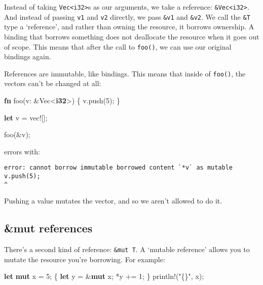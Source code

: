 \documentclass[a4paper,]{book}
\newenvironment{Shaded}{\begin{snugshade}}{\end{snugshade}}
\newcommand{\KeywordTok}[1]{\textcolor[rgb]{0.13,0.29,0.53}{\textbf{{#1}}}}
\newcommand{\DecValTok}[1]{\textcolor[rgb]{0.00,0.00,0.81}{{#1}}}
\newcommand{\StringTok}[1]{\textcolor[rgb]{0.31,0.60,0.02}{{#1}}}
\newcommand{\OtherTok}[1]{\textcolor[rgb]{0.56,0.35,0.01}{{#1}}}
\newcommand{\NormalTok}[1]{{#1}}
\begin{document}
Instead of taking \texttt{Vec\textless{}i32\textgreater{}}s as our
arguments, we take a reference:
\texttt{\&Vec\textless{}i32\textgreater{}}. And instead of passing
\texttt{v1} and \texttt{v2} directly, we pass \texttt{\&v1} and
\texttt{\&v2}. We call the \texttt{\&T} type a `reference', and rather
than owning the resource, it borrows ownership. A binding that borrows
something does not deallocate the resource when it goes out of scope.
This means that after the call to \texttt{foo()}, we can use our
original bindings again.

References are immutable, like bindings. This means that inside of
\texttt{foo()}, the vectors can't be changed at all:

\begin{Shaded}
\begin{Highlighting}[]
\KeywordTok{fn} \NormalTok{foo(v: &Vec<}\KeywordTok{i32}\NormalTok{>) \{}
     \NormalTok{v.push(}\DecValTok{5}\NormalTok{);}
\NormalTok{\}}

\KeywordTok{let} \NormalTok{v = }\OtherTok{vec!}\NormalTok{[];}

\NormalTok{foo(&v);}
\end{Highlighting}
\end{Shaded}

errors with:

\begin{verbatim}
error: cannot borrow immutable borrowed content `*v` as mutable
v.push(5);
^
\end{verbatim}

Pushing a value mutates the vector, and so we aren't allowed to do it.

\subsection{\&mut references}\label{mut-references}

There's a second kind of reference: \texttt{\&mut\ T}. A `mutable
reference' allows you to mutate the resource you're borrowing. For
example:

\begin{Shaded}
\begin{Highlighting}[]
\KeywordTok{let} \KeywordTok{mut} \NormalTok{x = }\DecValTok{5}\NormalTok{;}
\NormalTok{\{}
    \KeywordTok{let} \NormalTok{y = &}\KeywordTok{mut} \NormalTok{x;}
    \NormalTok{*y += }\DecValTok{1}\NormalTok{;}
\NormalTok{\}}
\OtherTok{println!}\NormalTok{(}\StringTok{"\{\}"}\NormalTok{, x);}
\end{Highlighting}
\end{Shaded}
\end{document}
